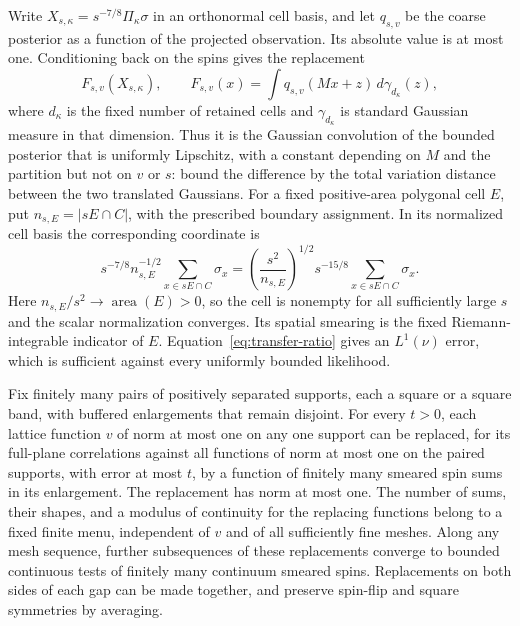 Write $X_{s,\kappa}=s^{-7/8}\Pi_\kappa\sigma$ in an orthonormal
cell basis, and let $q_{s,v}$ be the coarse posterior as a function of
the projected observation.  Its absolute value is at most one.
Conditioning back on the spins gives the replacement
\[
 F_{s,v}(X_{s,\kappa}),\qquad
 F_{s,v}(x)=\int q_{s,v}(Mx+z)\,d\gamma_{d_\kappa}(z),
\]
where $d_\kappa$ is the fixed number of retained cells and
$\gamma_{d_\kappa}$ is standard Gaussian measure in that dimension.
Thus it is the Gaussian convolution of the bounded posterior that is
uniformly Lipschitz, with a constant depending on $M$ and the partition
but not on $v$ or $s$: bound the difference by the total variation
distance between the two translated Gaussians.
For a fixed positive-area polygonal cell
$E$, put $n_{s,E}=|sE\cap C|$, with the prescribed boundary assignment.
In its normalized cell basis the corresponding coordinate is
\[
 s^{-7/8}n_{s,E}^{-1/2}\sum_{x\in sE\cap C}\sigma_x
 =\left(\frac{s^2}{n_{s,E}}\right)^{1/2}
       s^{-15/8}\sum_{x\in sE\cap C}\sigma_x.
\]
Here $n_{s,E}/s^2\to\operatorname{area}(E)>0$, so the cell is nonempty
for all sufficiently large $s$ and the scalar normalization converges.
Its spatial smearing is the fixed Riemann-integrable indicator of $E$.
Equation~\eqref{eq:transfer-ratio} gives an $L^1(\nu)$
error, which is sufficient against every uniformly bounded likelihood.

\begin{lemma}
\label{lem:bounded-replacement}
Fix finitely many pairs of positively separated supports, each a square
or a square band, with buffered enlargements that remain disjoint.
For every $t>0$, each lattice function $v$ of norm at most one on any
one support can be replaced, for its full-plane correlations against all
functions of norm at most one on the paired supports, with error at most
$t$, by a function
of finitely many smeared spin sums in its enlargement.  The replacement
has norm at most one.  The number of sums, their shapes, and a modulus
of continuity for the replacing functions belong to a fixed finite
menu, independent of $v$ and of all sufficiently fine meshes.
Along any mesh sequence, further subsequences of these replacements
converge to bounded continuous tests of finitely many continuum smeared
spins.  Replacements on both sides of each gap can be made together,
and preserve spin-flip and square symmetries by averaging.
\end{lemma}


